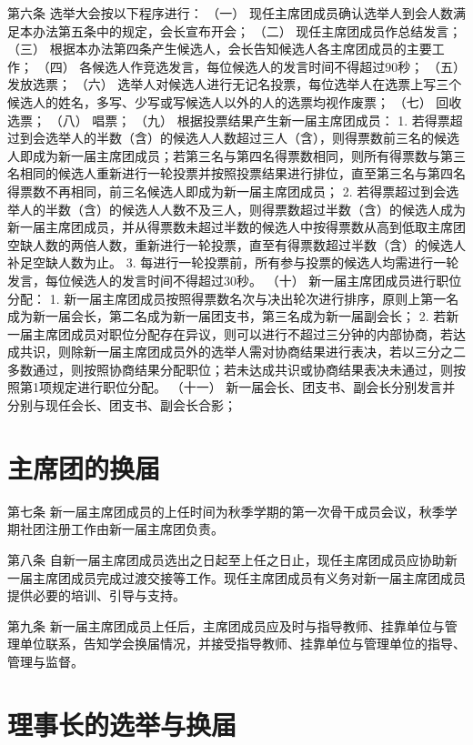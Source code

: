 第六条  选举大会按以下程序进行：
（一）  现任主席团成员确认选举人到会人数满足本办法第五条中的规定，会长宣布开会；
（二）  现任主席团成员作总结发言；
（三）  根据本办法第四条产生候选人，会长告知候选人各主席团成员的主要工作；
（四）  各候选人作竞选发言，每位候选人的发言时间不得超过90秒；
（五）  发放选票；
（六）  选举人对候选人进行无记名投票，每位选举人在选票上写三个候选人的姓名，多写、少写或写候选人以外的人的选票均视作废票；
（七）  回收选票；
（八）  唱票；
（九）  根据投票结果产生新一届主席团成员：
1.  若得票超过到会选举人的半数（含）的候选人人数超过三人（含），则得票数前三名的候选人即成为新一届主席团成员；若第三名与第四名得票数相同，则所有得票数与第三名相同的候选人重新进行一轮投票并按照投票结果进行排位，直至第三名与第四名得票数不再相同，前三名候选人即成为新一届主席团成员；
2.  若得票超过到会选举人的半数（含）的候选人人数不及三人，则得票数超过半数（含）的候选人成为新一届主席团成员，并从得票数未超过半数的候选人中按得票数从高到低取主席团空缺人数的两倍人数，重新进行一轮投票，直至有得票数超过半数（含）的候选人补足空缺人数为止。
3.  每进行一轮投票前，所有参与投票的候选人均需进行一轮发言，每位候选人的发言时间不得超过30秒。
（十）  新一届主席团成员进行职位分配：
1.  新一届主席团成员按照得票数名次与决出轮次进行排序，原则上第一名成为新一届会长，第二名成为新一届团支书，第三名成为新一届副会长；
2.  若新一届主席团成员对职位分配存在异议，则可以进行不超过三分钟的内部协商，若达成共识，则除新一届主席团成员外的选举人需对协商结果进行表决，若以三分之二多数通过，则按照协商结果分配职位；若未达成共识或协商结果表决未通过，则按照第1项规定进行职位分配。
（十一）  新一届会长、团支书、副会长分别发言并分别与现任会长、团支书、副会长合影；

\section{主席团的换届}

第七条  新一届主席团成员的上任时间为秋季学期的第一次骨干成员会议，秋季学期社团注册工作由新一届主席团负责。

第八条  自新一届主席团成员选出之日起至上任之日止，现任主席团成员应协助新一届主席团成员完成过渡交接等工作。现任主席团成员有义务对新一届主席团成员提供必要的培训、引导与支持。

第九条  新一届主席团成员上任后，主席团成员应及时与指导教师、挂靠单位与管理单位联系，告知学会换届情况，并接受指导教师、挂靠单位与管理单位的指导、管理与监督。

\section{理事长的选举与换届}

